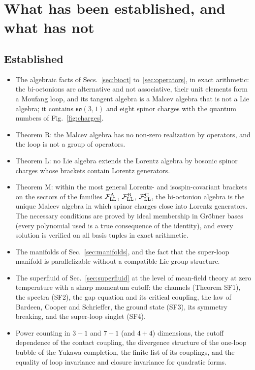 \section{What has been established, and what has not}
\label{sec:status}

\subsection{Established}

\begin{itemize}
\item The algebraic facts of Secs.~\ref{sec:bioct} to~\ref{sec:operators}, in exact arithmetic: the
bi-octonions are alternative and not associative, their unit elements form a Moufang loop, and its
tangent algebra is a Malcev algebra that is not a Lie algebra; it contains $\mathfrak{so}(3,1)$ and eight
spinor charges with the quantum numbers of Fig.~\ref{fig:charges}.
\item Theorem R: the Malcev algebra has no non-zero realization by operators, and the loop is not a group
of operators.
\item Theorem L: no Lie algebra extends the Lorentz algebra by bosonic spinor charges whose brackets
contain Lorentz generators.
\item Theorem M: within the most general Lorentz- and isospin-covariant brackets on the sectors of the
families $\mathcal F^{\rm A}_{\rm LL}$, $\mathcal F^{\rm B}_{\rm LL}$, $\mathcal F^{\rm C}_{\rm LL}$, the
bi-octonion algebra is the unique Malcev algebra in which spinor charges close into Lorentz
generators. The necessary conditions are proved by ideal membership in Gr\"obner bases (every
polynomial used is a true consequence of the identity), and every solution is verified on all basis
tuples in exact arithmetic.
\item The manifolds of Sec.~\ref{sec:manifolds}, and the fact that the super-loop manifold is
parallelizable without a compatible Lie group structure.
\item The superfluid of Sec.~\ref{sec:superfluid} at the level of mean-field theory at zero temperature
with a sharp momentum cutoff: the channels (Theorem SF1), the spectra (SF2), the gap equation and its
critical coupling, the law of Bardeen, Cooper and Schrieffer, the ground state (SF3), its symmetry
breaking, and the super-loop singlet (SF4).
\item Power counting in $3+1$ and $7+1$ (and $4+4$) dimensions, the cutoff dependence of the contact
coupling, the divergence structure of the one-loop bubble of the Yukawa completion, the finite list of
its couplings, and the equality of loop invariance and closure invariance for quadratic forms.
\end{itemize}

